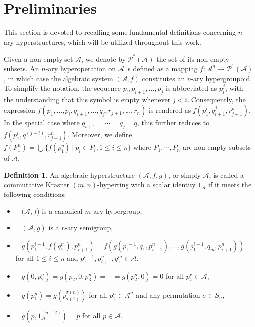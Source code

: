 \documentclass[preprint,review,10pt]{amsart}
\theoremstyle{definition}
\newtheorem{definition}[theorem]{Definition}
\theoremstyle{remark}
\numberwithin{equation}{section}
\begin{document}
\section{Preliminaries}
This section is devoted to recalling some fundamental definitions concerning $n$-ary hyperstructures, which will be utilized throughout this work.

Given a non-empty set $\mathscr{A}$, we denote by $\mathcal{P}^*(\mathscr{A})$ the set of its non-empty subsets. An $n$-ary hyperoperation on $\mathscr{A}$ is defined as a mapping $f : \mathscr{A}^n \to \mathcal{P}^*(\mathscr{A})$, in which case the algebraic system $(\mathscr{A}, f)$ constitutes an $n$-ary hypergroupoid.
To simplify the notation, the sequence $p_i, p_{i+1}, \dots, p_j$ is abbreviated as $p^j_i$, with the understanding that this symbol is empty whenever $j < i$. Consequently, the expression $f(p_1, \dots, p_i, q_{i+1}, \dots, q_j, r_{j+1}, \dots, r_n)$ is rendered as $f(p^i_1, q^j_{i+1}, r^n_{j+1})$. In the special case where $q_{i+1} = \cdots = q_j = q$, this further reduces to $f(p^i_1, q^{(j-i)}, r^n_{j+1})$. Moreover, we  define $f(P^n_1)= \bigcup \{f(p^n_1) \ \vert \ p_i \in P_i, 1 \leq i \leq n \}$ where $P_1,\cdots, P_n$ are non-empty subsets of $\mathscr{A}$.
\begin{definition}
\cite{d1} An algebraic hyperstructure  $(\mathscr{A}, f, g)$, or simply $\mathscr{A}$, is called a commutative Krasner $(m, n)$-hyperring with a scalar identity $1_\mathscr{A}$ if  it meets the following conditions:

\begin{itemize} 
\item[\rm{{\bf i.}}]~ $(\mathscr{A}, f$) is a canonical $m$-ary hypergroup, 

\item[\rm{{\bf ii.}}]~ $(\mathscr{A}, g)$ is a $n$-ary semigroup, 

\item[\rm{{\bf iii.}}]~ $g(p^{i-1}_1, f(q^m _1 ), p^n _{i+1}) = f(g(p^{i-1}_1, q_1,p^n_{ i+1}),\ldots, g(p^{i-1}_1, q_m, p^n_{ i+1}))$ for all   $1 \leq i \leq n$ and $p^{i-1}_1 , p^n_{ i+1}, q^m_ 1 \in \mathscr{A}$. 

\item[\rm{{\bf iv.}}]~ $g(0, p^n _2) = g(p_2, 0, p^n _3) = \cdots = g(p^n_ 2, 0) = 0$ for all $p^n_ 2 \in \mathscr{A}$, 

\item[\rm{{\bf v.}}]~ $g(p_1^n) = g(p_{\sigma(1)}^{\sigma(n)})$ for all $p_1^n \in \mathscr{A}^n$ and any permutation $\sigma \in S_n$, 

\item[\rm{{\bf vi.}}]~ $g(p,1_\mathscr{A}^{(n-2)})=p$ for all $p \in \mathscr{A}$.
\end{itemize}
\end{definition}
\end{document}
